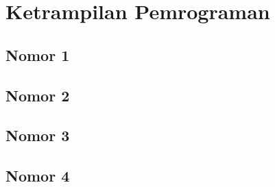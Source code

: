 \chapter{Ketrampilan Pemrograman}

\section{Nomor 1}

\section{Nomor 2}

\section{Nomor 3}

\section{Nomor 4}
